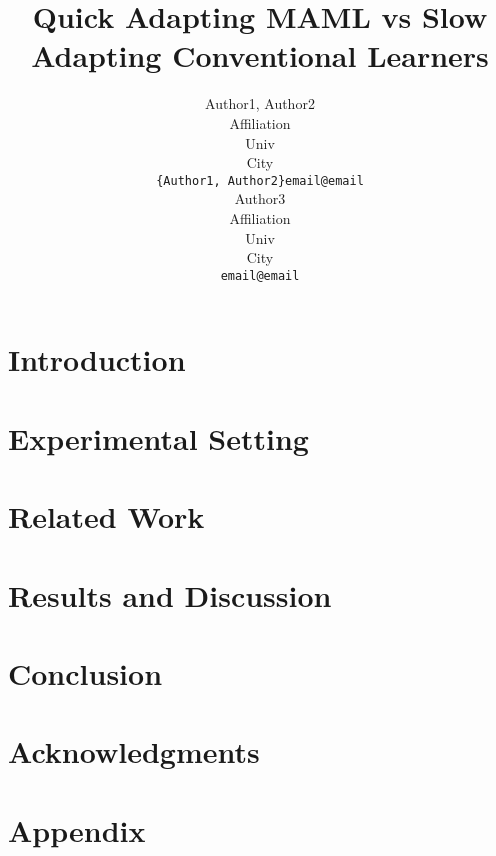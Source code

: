 \documentclass{article}
\title{Quick Adapting MAML vs Slow Adapting Conventional Learners}
\author{
  Author1, Author2 \\
  Affiliation \\
  Univ \\
  City\\
  \texttt{\{Author1, Author2\}email@email} \\
   \And
  Author3 \\
  Affiliation \\
  Univ \\
  City\\
  \texttt{email@email} \\
}
\newcommand{\version}{v2/}
\begin{document}
\maketitle


\begin{abstract}
  
\end{abstract}



\section{Introduction}\label{sec:intro}
  
\section{Experimental Setting}\label{sec:methods}
  
\section{Related Work}\label{sec:rw}
  
\section{Results and Discussion}\label{sec:resdis}
  
\section{Conclusion}\label{sec:conc}
  
\section*{Acknowledgments}
  
  
\newpage
\section{Appendix}
  
\end{document}
